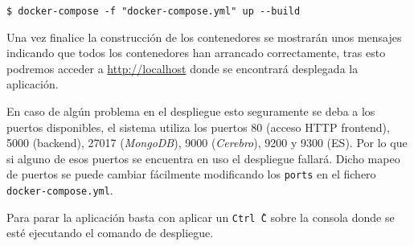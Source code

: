 \begin{lstlisting}[style=Consola, caption=Comando para desplegar el sistema]
$ docker-compose -f "docker-compose.yml" up --build
\end{lstlisting}

Una vez finalice la construcción de los contenedores se mostrarán unos mensajes indicando que todos los contenedores han arrancado correctamente, tras esto podremos acceder a \url{http://localhost} donde se encontrará desplegada la aplicación.

En caso de algún problema en el despliegue esto seguramente se deba a los puertos disponibles, el sistema utiliza los puertos 80 (acceso \acrshort{HTTP} \gls{frontend}), 5000 (\gls{backend}), 27017 (\textit{MongoDB}), 9000 (\textit{Cerebro}), 9200 y 9300 (\acrlong{ES}). Por lo que si alguno de esos puertos se encuentra en uso el despliegue fallará. Dicho mapeo de puertos se puede cambiar fácilmente modificando los \texttt{ports} en el fichero \texttt{docker-compose.yml}.


Para parar la aplicación basta con aplicar un \texttt{Ctrl\^\ C} sobre la consola donde se esté ejecutando el comando de despliegue.



